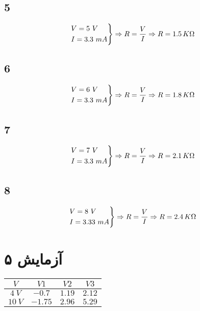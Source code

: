 \documentclass{article}
\begin{document}
		\subsection{5}
		\begin{equation*}
			\begin{rcases}
				V = 5 \ V  \\	
				I = 3.3 \ mA
			\end{rcases}
			\Rightarrow R = \frac{V}{I} \Rightarrow R = 1.5 \, K \Omega
		\end{equation*}
		
		\subsection{6}
		\begin{equation*}
			\begin{rcases}
				V = 6 \ V  \\	
				I = 3.3 \ mA
			\end{rcases}
			\Rightarrow R = \frac{V}{I} \Rightarrow R = 1.8 \, K \Omega
		\end{equation*}
		
		\subsection{7}
		\begin{equation*}
			\begin{rcases}
				V = 7 \ V  \\	
				I = 3.3 \ mA
			\end{rcases}
			\Rightarrow R = \frac{V}{I} \Rightarrow R = 2.1 \, K \Omega
		\end{equation*}
		
		\subsection{8}
		\begin{equation*}
			\begin{rcases}
				V = 8 \ V  \\	
				I = 3.33 \ mA
			\end{rcases}
			\Rightarrow R = \frac{V}{I} \Rightarrow R = 2.4 \, K \Omega
		\end{equation*}
		
		\section{آزمایش ۵}
			\begin{center}
				\begin{tabular}{|c|c|c|c|}
					\hline
					$V$ & $V1$ & $V2$ & $V3$ \\
					\hline
					\hline
					$4 \ V$ & $-0.7$ & $1.19$ & $2.12$ \\
					\hline
					$10 \ V$ & $-1.75$ & $2.96$ & $5.29$ \\
					\hline
				\end{tabular}
			\end{center}
		
\end{document}
